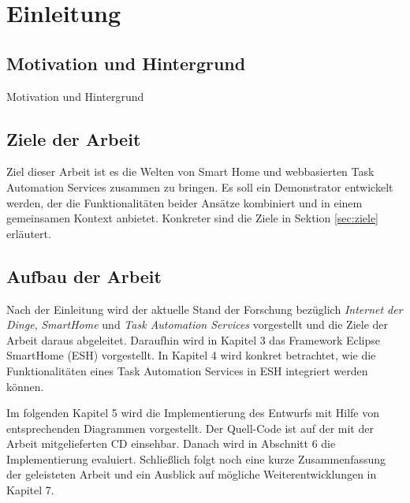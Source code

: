 \chapter{Einleitung}
\section{Motivation und Hintergrund}
Motivation und Hintergrund

\section{Ziele der Arbeit}
Ziel dieser Arbeit ist es die Welten von Smart Home und webbasierten Task Automation Services zusammen zu bringen. Es soll ein Demonstrator entwickelt werden, der die  Funktionalitäten beider Ansätze kombiniert und in einem gemeinsamen Kontext anbietet. Konkreter sind die Ziele in Sektion \ref{sec:ziele} erläutert.


\section{Aufbau der Arbeit}
Nach der Einleitung wird der aktuelle Stand der Forschung bezüglich \textit{Internet der Dinge}, \textit{SmartHome} und \textit{Task Automation Services} vorgestellt und die Ziele der Arbeit daraus abgeleitet. Daraufhin wird in Kapitel 3 das Framework Eclipse SmartHome (ESH) vorgestellt. In Kapitel 4 wird konkret betrachtet, wie die Funktionalitäten eines Task Automation Services in ESH integriert werden können.

Im folgenden Kapitel 5 wird die Implementierung des Entwurfs mit Hilfe von entsprechenden
Diagrammen vorgestellt. Der Quell-Code ist auf der mit der Arbeit mitgelieferten
CD einsehbar. Danach wird in Abschnitt 6 die Implementierung evaluiert. Schließlich folgt
noch eine kurze Zusammenfassung der geleisteten Arbeit und ein Ausblick auf mögliche
Weiterentwicklungen in Kapitel 7.

